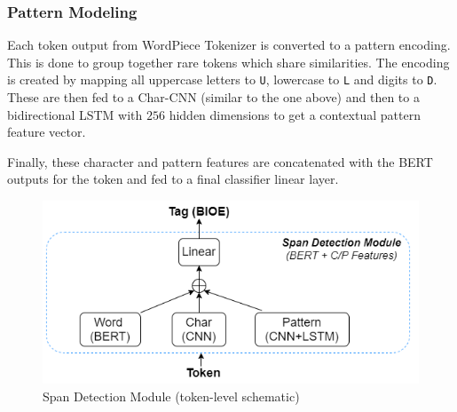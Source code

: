 \subsubsection{Pattern Modeling} Each token output from WordPiece Tokenizer is converted to a pattern encoding. This is done to group together rare tokens which share similarities. The encoding is created by mapping all uppercase letters to \texttt{U}, lowercase to \texttt{L} and digits to \texttt{D}. These are then fed to a Char-CNN (similar to the one above) and then to a bidirectional LSTM with $256$ hidden dimensions to get a contextual pattern feature vector.
    
Finally, these character and pattern features are concatenated with the BERT outputs for the token and fed to a final classifier linear layer. 
    

\begin{figure}[h!]
    \centering
    \includegraphics[width=\linewidth]{span_det6.png}
    \caption{Span Detection Module (token-level schematic)}
    \label{fig:span_detection}
\end{figure}
